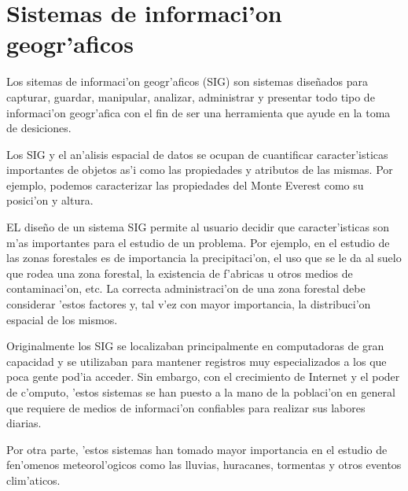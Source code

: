\section{Sistemas de informaci'on geogr'aficos}
Los sitemas de informaci'on geogr'aficos (SIG) son sistemas dise\~nados para capturar, guardar, manipular, analizar,
administrar y presentar todo tipo de informaci'on geogr'afica con el fin de ser una herramienta que ayude en la toma
de desiciones.

Los SIG y el an'alisis espacial de datos se ocupan de cuantificar caracter'isticas importantes de objetos
as'i como las propiedades y atributos de las mismas. Por ejemplo, podemos caracterizar las propiedades del Monte 
Everest como su posici'on y altura.

EL dise\~no de un sistema SIG permite al usuario decidir que caracter'isticas son m'as importantes para el estudio 
de un problema. Por ejemplo, en el estudio de las zonas forestales es de importancia la precipitaci'on, el uso que 
se le da al suelo que rodea una zona forestal, la existencia de f'abricas u otros medios de contaminaci'on, etc. 
La correcta administraci'on de una zona forestal debe considerar 'estos factores y, tal v'ez con mayor importancia,
la distribuci'on espacial de los mismos.

Originalmente los SIG se localizaban principalmente en computadoras de gran capacidad y se utilizaban para mantener
registros muy especializados a los que poca gente pod'ia acceder. 
Sin embargo, con el crecimiento de Internet y el poder de c'omputo, 'estos sistemas se han puesto a la mano de 
la poblaci'on en general que requiere de medios de informaci'on confiables para realizar sus labores diarias.

Por otra parte, 'estos sistemas han tomado mayor importancia en el estudio de fen'omenos meteorol'ogicos como las
lluvias, huracanes, tormentas y otros eventos clim'aticos.